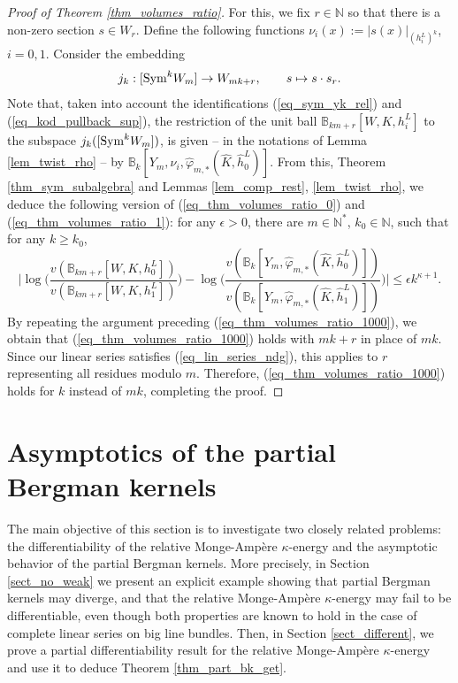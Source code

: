 \documentclass[12pt]{article}
\numberwithin{equation}{section}
\theoremstyle{theorem}
\theoremstyle{definition}
\theoremstyle{remark}
\newcommand{\vol}{v}
\newcommand{\nat}{\mathbb{N}}
\begin{document}
\begin{proof}[Proof of Theorem \ref{thm_volumes_ratio}]
		\par 
		For this, we fix $r \in \nat$ so that there is a non-zero section $s \in W_r$.
		Define the following functions $\nu_i(x) := |s(x)|_{(h^L_i)^k}$, $i = 0, 1$.
		Consider the embedding 
		\begin{equation}
			j_k: [{\rm{Sym}}^k W_m] \to W_{mk + r}, \qquad s \mapsto s \cdot s_r.
		\end{equation}
		Note that, taken into account the identifications (\ref{eq_sym_yk_rel}) and (\ref{eq_kod_pullback_sup}), the restriction of the unit ball $\mathbb{B}_{km + r}[W, K, h^L_i]$ to the subspace $j_k([{\rm{Sym}}^k W_m])$, is given -- in the notations of Lemma \ref{lem_twist_rho} -- by $\mathbb{B}_k[Y_m, \nu_i, \widehat{\varphi}_{m, *} (\widehat{K}, \widehat{h}^L_0)]$.
		From this, Theorem \ref{thm_sym_subalgebra} and Lemmas \ref{lem_comp_rest}, \ref{lem_twist_rho}, we deduce the following version of (\ref{eq_thm_volumes_ratio_0}) and (\ref{eq_thm_volumes_ratio_1}): for any $\epsilon > 0$, there are $m \in \nat^*$, $k_0 \in \nat$, such that for any $k \geq k_0$,
		\begin{equation}\label{eq_thm_volumes_ratio_0nn}
			\Big|
			\log\Big(\frac{\vol(\mathbb{B}_{km + r}[W, K, h^L_0])}{\vol(\mathbb{B}_{km + r}[W, K, h^L_1])}
			\Big)
			-
			\log\Big(
			\frac{\vol(\mathbb{B}_k[Y_m, \widehat{\varphi}_{m, *} (\widehat{K}, \widehat{h}^L_0)])}{\vol(\mathbb{B}_k[Y_m, \widehat{\varphi}_{m, *} (\widehat{K}, \widehat{h}^L_1)])}
			\Big)
			\Big|
			\leq
			\epsilon k^{\kappa + 1}.
		\end{equation}
		By repeating the argument preceding (\ref{eq_thm_volumes_ratio_1000}), we obtain that (\ref{eq_thm_volumes_ratio_1000}) holds with $mk + r$ in place of $mk$.
		Since our linear series satisfies (\ref{eq_lin_series_ndg}), this applies to $r$ representing all residues modulo $m$. 
		Therefore, (\ref{eq_thm_volumes_ratio_1000}) holds for $k$ instead of $mk$, completing the proof.
 	\end{proof}
	
	
	\section{Asymptotics of the partial Bergman kernels}\label{sect_pbk}
	The main objective of this section is to investigate two closely related problems: the differentiability of the relative Monge-Ampère $\kappa$-energy and the asymptotic behavior of the partial Bergman kernels.
	More precisely, in Section \ref{sect_no_weak} we present an explicit example showing that partial Bergman kernels may diverge, and that the relative Monge-Ampère $\kappa$-energy may fail to be differentiable, even though both properties are known to hold in the case of complete linear series on big line bundles.
	Then, in Section \ref{sect_different}, we prove a partial differentiability result for the relative Monge-Ampère $\kappa$-energy and use it to deduce Theorem \ref{thm_part_bk_get}.
	
\end{document}
